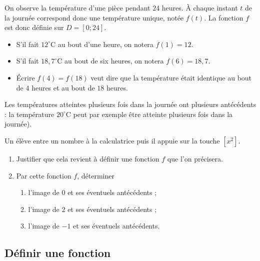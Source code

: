 \documentclass[11pt]{article}
\begin{document}
\begin{exemple}
  On observe la température d'une pièce pendant $24$ heures. À chaque instant
  $t$ de la journée correspond donc une température unique, notée $f(t)$. La
  fonction $f$ est donc définie sur $D=\left[ 0;24 \right]$.
  \begin{itemize}
    \item S'il fait $12^\circ$C au bout d'une heure, on notera $f(1)=12$.
    \item S'il fait $18,7^\circ$C au bout de six heures, on
      notera $f(6)=18,7$.
    \item Écrire $f(4)=f(18)$ veut dire que la température était identique au
      bout de $4$ heures et au bout de $18$ heures.
  \end{itemize}
  Les températures atteintes plusieurs fois dans la journée ont plusieurs
  antécédents : la température $20^\circ$C peut par exemple être atteinte
  plusieurs fois dans la journée).
\end{exemple}
\begin{app}
  Un élève entre un nombre à la calculatrice puis il appuie sur la touche $\left[ x^2
  \right]$.
  \begin{enumerate}
    \item Justifier que cela revient à définir une fonction $f$ que l'on
      précisera.
    \item Par cette fonction $f$, déterminer
      \begin{enumerate}
        \item l'image de $0$ et ses éventuels antécédents ;
        \item l'image de $2$ et ses éventuels antécédents ;
        \item l'image de $-1$ et ses éventuels antécédents.
      \end{enumerate}
  \end{enumerate}
\end{app}

\subsection{Définir une fonction}
\end{document}

